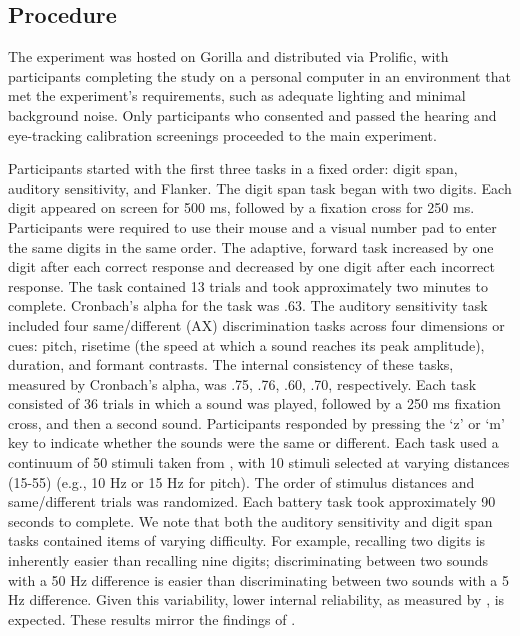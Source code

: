 \subsection{Procedure}

The experiment was hosted on Gorilla \citep{Anwyl-Irvine_2019} and distributed via Prolific, with participants completing the study on a personal computer in an environment that met the experiment’s requirements, such as adequate lighting and minimal background noise. Only participants who consented and passed the hearing and eye-tracking calibration screenings proceeded to the main experiment.

Participants started with the first three tasks in a fixed order: digit span, auditory sensitivity, and Flanker. The digit span task began with two digits. Each digit appeared on screen for 500 ms, followed by a fixation cross for 250 ms. Participants were required to use their mouse and a visual number pad to enter the same digits in the same order. The adaptive, forward task increased by one digit after each correct response and decreased by one digit after each incorrect response. The task contained 13 trials and took approximately two minutes to complete. Cronbach's alpha for the task was .63. The auditory sensitivity task included four same/different (AX) discrimination tasks across four dimensions or cues:  pitch, risetime (the speed at which a sound reaches its peak amplitude), duration, and formant contrasts. The internal consistency of these tasks, measured by Cronbach’s alpha, was .75, .76, .60, .70, respectively. Each task consisted of 36 trials in which a sound was played, followed by a 250 ms fixation cross, and then a second sound. Participants responded by pressing the ‘z’ or ‘m’ key to indicate whether the sounds were the same or different. Each task used a continuum of 50 stimuli taken from \citep{Kachlicka_Saito_Tierney_2019}, with 10 stimuli selected at varying distances (15-55) (e.g., 10 Hz or 15 Hz for pitch). The order of stimulus distances and same/different trials was randomized. Each battery task took approximately 90 seconds to complete. We note that both the auditory sensitivity and digit span tasks contained items of varying difficulty. For example, recalling two digits is inherently easier than recalling nine digits; discriminating between two sounds with a 50 Hz difference is easier than discriminating between two sounds with a 5 Hz difference. Given this variability, lower internal reliability, as measured by \cite{Cronbach1951}, is expected. These results mirror the findings of \cite{ppcc}.

